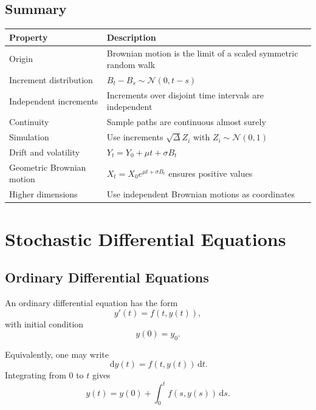 \documentclass[12pt,oneside]{book}
\numberwithin{equation}{section}
\theoremstyle{definition}
\theoremstyle{plain}
\theoremstyle{remark}
\newcommand{\dd}{\,\mathrm{d}}
\newcommand{\Normal}{\mathcal{N}}
\begin{document}
\section{Summary}

\begin{center}
\begin{xltabular}{\textwidth}{>{\raggedright\arraybackslash}p{0.28\textwidth}
>{\raggedright\arraybackslash}X}
\toprule
Property & Description \\
\midrule
Origin
& Brownian motion is the limit of a scaled symmetric random walk \\

Increment distribution
& $B_t-B_s\sim \Normal(0,t-s)$ \\

Independent increments
& Increments over disjoint time intervals are independent \\

Continuity
& Sample paths are continuous almost surely \\

Simulation
& Use increments $\sqrt{\Delta}Z_i$ with $Z_i\sim \Normal(0,1)$ \\

Drift and volatility
& $Y_t=Y_0+\mu t+\sigma B_t$ \\

Geometric Brownian motion
& $X_t=X_0e^{\mu t+\sigma B_t}$ ensures positive values \\

Higher dimensions
& Use independent Brownian motions as coordinates \\
\bottomrule
\end{xltabular}
\end{center}

\chapter{Stochastic Differential Equations}

\section{Ordinary Differential Equations}

An ordinary differential equation has the form
\[
y'(t)=f(t,y(t)),
\]
with initial condition
\[
y(0)=y_0.
\]

Equivalently, one may write
\[
\dd y(t)=f(t,y(t))\dd t.
\]
Integrating from $0$ to $t$ gives
\[
y(t)=y(0)+\int_0^t f(s,y(s))\dd s.
\]
\end{document}
